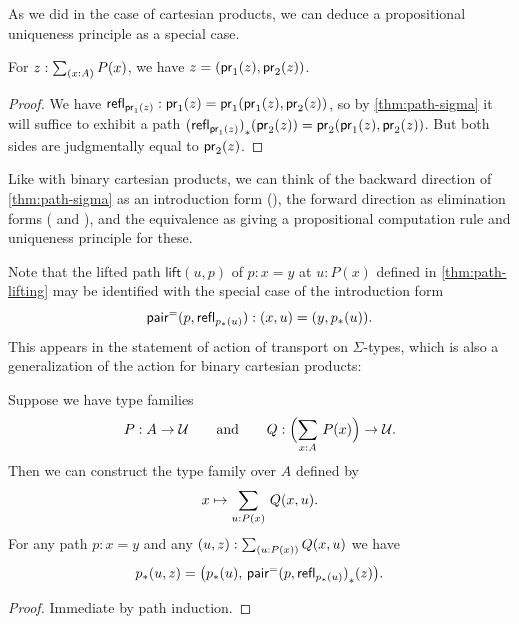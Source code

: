 As we did in the case of cartesian products, we can deduce a propositional uniqueness principle as a special case.

\begin{cor}\label{thm:eta-sigma}
  For $z:\sm{x:A} P(x)$, we have $z = (\mathsf{pr}_{1}(z),\mathsf{pr}_{2}(z))$.
\end{cor}
\begin{proof}
  We have $\mathsf{refl}_{\mathsf{pr}_{1}(z)} : \mathsf{pr}_{1}(z) = \mathsf{pr}_{1}(\mathsf{pr}_{1}(z),\mathsf{pr}_{2}(z))$, so by \cref{thm:path-sigma} it will suffice to exhibit a path ${(\mathsf{refl}_{\mathsf{pr}_{1}(z)})}_{*}\mathopen{}\left({\mathsf{pr}_{2}(z)}\right)\mathclose{} = \mathsf{pr}_{2}(\mathsf{pr}_{1}(z),\mathsf{pr}_{2}(z))$.
  But both sides are judgmentally equal to $\mathsf{pr}_{2}(z)$.
\end{proof}

Like with binary cartesian products, we can think of
the backward direction of \cref{thm:path-sigma} as
an introduction form (\pairpath{}{}), the forward direction as
elimination forms ( and ), and the equivalence
as giving a propositional computation rule and uniqueness principle for these.

Note that the lifted path $\mathsf{lift}(u,p)$  of $p:x=y$ at $u:P(x)$ defined in \cref{thm:path-lifting} may be identified with the special case of the introduction form
\[\mathsf{pair}^{\mathord{=}}(p,\mathsf{refl}_{{p}_{*}\mathopen{}\left({u}\right)\mathclose{}}):(x,u) = (y,{p}_{*}\mathopen{}\left({u}\right)\mathclose{}).\]
%
This appears in the statement of action of transport on $\Sigma$-types, which is also a generalization of the action for binary cartesian products:

\begin{thm}\label{transport-Sigma}
  Suppose we have type families
  \begin{equation*}
    P:A\to\type
    \qquad\text{and}\qquad
    Q:\Parens{\sm{x:A} P(x)}\to\type.
  \end{equation*}
  Then we can construct the type family over $A$ defined by
  \begin{equation*}
    x \mapsto \sm{u:P(x)} Q(x,u).
  \end{equation*}
  For any path $p:x=y$ and any $(u,z):\sm{u:P(x)} Q(x,u)$ we have
  \begin{equation*}
    {p}_{*}\mathopen{}\left({u,z}\right)\mathclose{}=\big({p}_{*}\mathopen{}\left({u}\right)\mathclose{},\,{\mathsf{pair}^{\mathord{=}}(p,\mathsf{refl}_{{p}_{*}\mathopen{}\left({u}\right)\mathclose{}})}_{*}\mathopen{}\left({z}\right)\mathclose{}\big).
  \end{equation*}
\end{thm}

\begin{proof}
Immediate by path induction.
\end{proof}

